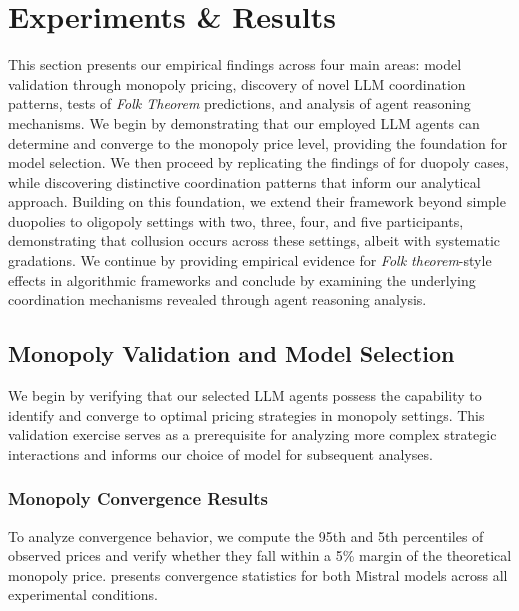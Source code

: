 \section{Experiments \& Results}\label{sec:res}

This section presents our empirical findings across four main areas: model validation through monopoly pricing, discovery of novel LLM coordination patterns, tests of \emph{Folk Theorem} predictions, and analysis of agent reasoning mechanisms. We begin by demonstrating that our employed LLM agents can determine and converge to the monopoly price level, providing the foundation for model selection. We then proceed by replicating the findings of \textcite{fish_algorithmic_2025} for duopoly cases, while discovering distinctive coordination patterns that inform our analytical approach. Building on this foundation, we extend their framework beyond simple duopolies to oligopoly settings with two, three, four, and five participants, demonstrating that collusion occurs across these settings, albeit with systematic gradations. We continue by providing empirical evidence for \emph{Folk theorem}-style effects in algorithmic frameworks and conclude by examining the underlying coordination mechanisms revealed through agent reasoning analysis.

\subsection{Monopoly Validation and Model Selection}

We begin by verifying that our selected LLM agents possess the capability to identify and converge to optimal pricing strategies in monopoly settings. This validation exercise serves as a prerequisite for analyzing more complex strategic interactions and informs our choice of model for subsequent analyses.

\subsubsection*{Monopoly Convergence Results}

To analyze convergence behavior, we compute the 95th and 5th percentiles of observed prices and verify whether they fall within a 5\% margin of the theoretical monopoly price.  presents convergence statistics for both Mistral models across all experimental conditions.



